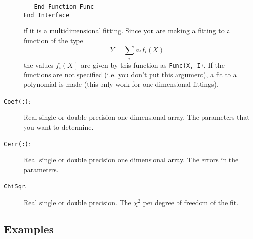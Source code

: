 \begin{description}
\begin{verbatim}
   End Function Func
End Interface
\end{verbatim}
if it is a multidimensional fitting. Since you are making a fitting
to a function of the type
\begin{displaymath}
  Y = \sum_i a_i f_i(X)
\end{displaymath}
the values $f_i(X)$ are given by this function as \texttt{Func(X,
  I)}. If the functions are not specified (i.e. you don't put this
argument), a fit to a polynomial is made (this only work for
one-dimensional fittings).
\item[\texttt{Coef(:)}: ] Real single or double precision one
  dimensional array. The
  parameters that you want to determine.
\item[\texttt{Cerr(:)}:] Real single or double precision one
  dimensional array. The errors
  in the parameters.
\item[\texttt{ChiSqr}: ] Real single or double precision. The $\chi^2$
  per degree of freedom of the fit.
\end{description}

\subsection{Examples}

